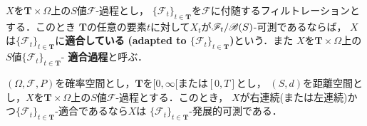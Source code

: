 	\begin{screen}
		\begin{dfn}[適合]
			$X$を$\mathbf{T} \times \Omega$上の$S$値$\mathscr{F}$-過程とし，
			$\{\mathscr{F}_t\}_{t \in \mathbf{T}}$を$\mathscr{F}$に付随するフィルトレーションとする．このとき
			$\mathbf{T}$の任意の要素$t$に対して$X_t$が$\mathscr{F}_t/\mathscr{B}(S)$-可測であるならば，
			$X$は$\{\mathscr{F}_t\}_{t \in \mathbf{T}}$に{\bf 適合している}
			{\bf (adapted to $\{\mathscr{F}_t\}_{t \in \mathbf{T}}$)}という．また
			$X$を$\mathbf{T} \times \Omega$上の$S$値$\{\mathscr{F}_t\}_{t \in \mathbf{T}}$-
			{\bf 適合過程}と呼ぶ．
		\end{dfn}
	\end{screen}
	
	\begin{screen}
		\begin{thm}[右連続または左連続な適合過程は発展的可測]
			$(\Omega,\mathscr{F},P)$を確率空間とし，$\mathbf{T}$を$[0,\infty[$または$[0,T]$とし，
			$(S,d)$を距離空間とし，$X$を$\mathbf{T} \times \Omega$上の$S$値$\mathscr{F}$-過程とする．このとき，
			$X$が右連続(または左連続)かつ$\{\mathscr{F}_t\}_{t \in \mathbf{T}}$-適合であるなら$X$は
			$\{\mathscr{F}_t\}_{t \in \mathbf{T}}$-発展的可測である．
		\end{thm}
	\end{screen}
	
